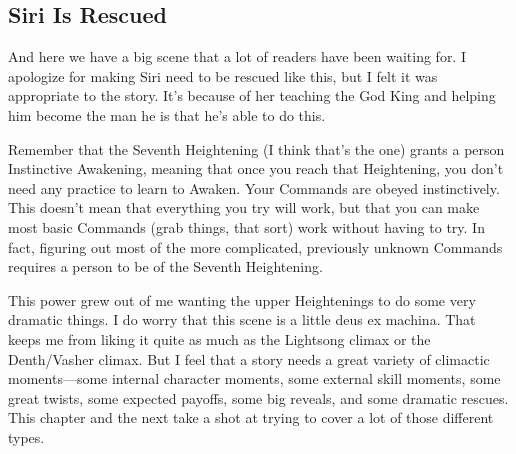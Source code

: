 \subsection*{Siri Is Rescued}

And here we have a big scene that a lot of readers have been waiting for. I apologize for making Siri need to be rescued like this, but I felt it was appropriate to the story. It’s because of her teaching the God King and helping him become the man he is that he’s able to do this.

Remember that the Seventh Heightening (I think that’s the one) grants a person Instinctive Awakening, meaning that once you reach that Heightening, you don’t need any practice to learn to Awaken. Your Commands are obeyed instinctively. This doesn’t mean that everything you try will work, but that you can make most basic Commands (grab things, that sort) work without having to try. In fact, figuring out most of the more complicated, previously unknown Commands requires a person to be of the Seventh Heightening.

This power grew out of me wanting the upper Heightenings to do some very dramatic things. I do worry that this scene is a little deus ex machina. That keeps me from liking it quite as much as the Lightsong climax or the Denth/Vasher climax. But I feel that a story needs a great variety of climactic moments—some internal character moments, some external skill moments, some great twists, some expected payoffs, some big reveals, and some dramatic rescues. This chapter and the next take a shot at trying to cover a lot of those different types.




